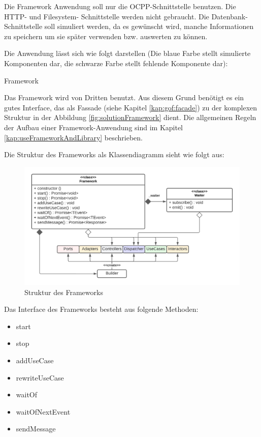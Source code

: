 Die Framework Anwendung soll nur die OCPP-Schnittstelle benutzen. 
Die HTTP- und Filesystem- Schnittstelle werden nicht gebraucht.
Die Datenbank-Schnittstelle soll simuliert werden, da es gewünscht wird, 
manche Informationen zu speichern um sie später verwenden bzw. auswerten zu können.

Die Anwendung lässt sich wie folgt darstellen 
(Die blaue Farbe stellt simulierte Komponenten dar, die schwarze Farbe stellt fehlende Komponente dar):

{Framework}

\newpage
Das Framework wird von Dritten benutzt. Aus diesem Grund benötigt es ein gutes Interface, 
das als Fassade (siehe Kapitel \ref{kap:gof:facade}) 
zu der komplexen Struktur in der Abbildung \ref{fig:solutionFramework} dient.
Die allgemeinen Regeln der Aufbau einer Framework-Anwendung sind im Kapitel \ref{kap:useFrameworkAndLibrary} beschrieben.

Die Struktur des Frameworks als Klassendiagramm sieht wie folgt aus:
\begin{figure}[H]
    \centering
    \includegraphics[width=1\textwidth]{./images/FrameworkKlassenDiagramm.png}
    \caption[Struktur des Frameworks]{Struktur des Frameworks}
    \label{fig:FrameworkStruktur}
\end{figure}

Das Interface des Frameworks besteht aus folgende Methoden:
\begin{itemize}
    \item start
    \item stop
    \item addUseCase
    \item rewriteUseCase
    \item waitOf
    \item waitOfNextEvent
    \item sendMessage
\end{itemize}

